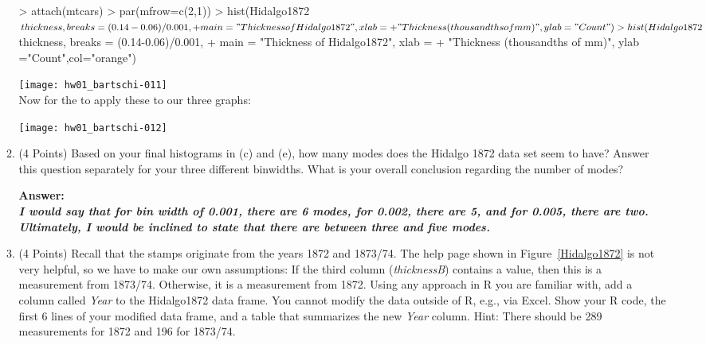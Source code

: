 \documentclass[12pt,letterpaper,final]{article}
\begin{document}
\begin{enumerate}
\begin{enumerate}
\begin{Schunk}
\begin{Sinput}
> attach(mtcars)
> par(mfrow=c(2,1))
> hist(Hidalgo1872$thickness, breaks = (0.14-0.06)/0.001, 
+      main = "Thickness of Hidalgo1872", xlab = 
+        "Thickness (thousandths of mm)", ylab ="Count")
> hist(Hidalgo1872$thickness, breaks = (0.14-0.06)/0.001, 
+      main = "Thickness of Hidalgo1872", xlab = 
+        "Thickness (thousandths of mm)", ylab ="Count",col="orange")
\end{Sinput}
\end{Schunk}
\texttt{[image: hw01\_bartschi-011]}
~\\
Now for the to apply these to our three graphs:

\begin{Schunk}
\end{Schunk}
\texttt{[image: hw01\_bartschi-012]}

\item (4 Points)
Based on your final histograms in (c) and (e), how many modes does the Hidalgo 1872 data set
seem to have? Answer this question separately for your three different binwidths.
What is your overall conclusion regarding the number of modes?

{\bf Answer:\\\it I would say that for bin width of 0.001, there are 6 modes, for 0.002, there are 5, and for 0.005, there are two.  Ultimately, I would be inclined to state that there are between three and five modes.}

\item (4 Points)
Recall that the stamps originate from the years 1872 and 1873/74. The help page shown in
Figure~\ref{Hidalgo1872} is not very helpful, so we have to make our own assumptions:
If the third column ({\it  thicknessB}) contains a value, then this is a measurement
from 1873/74. Otherwise, it is a measurement from 1872. Using any approach in R you are
familiar with, add a column called {\it Year} to the Hidalgo1872 data frame.
You cannot modify the data outside of R, e.g., via Excel. Show your R code,
the first 6 lines of your modified data frame, and a table that summarizes
the new {\it Year} column. Hint: There should be 289 measurements for 1872
and 196 for 1873/74.


\end{enumerate}
\end{enumerate}
\end{document}
